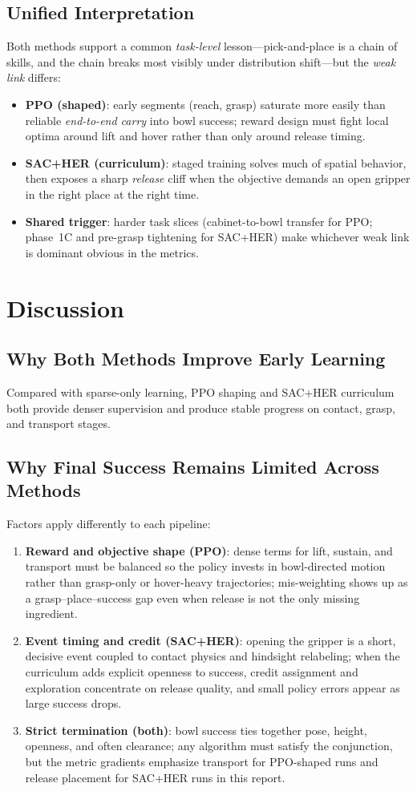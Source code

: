 \documentclass[11pt,a4paper]{article}
\begin{document}
\subsection{Unified Interpretation}
Both methods support a common \emph{task-level} lesson---pick-and-place is a chain of skills, and the chain breaks most visibly under distribution shift---but the \emph{weak link} differs:
\begin{itemize}
    \item \textbf{PPO (shaped)}: early segments (reach, grasp) saturate more easily than reliable \emph{end-to-end carry} into bowl success; reward design must fight local optima around lift and hover rather than only around release timing.
    \item \textbf{SAC+HER (curriculum)}: staged training solves much of spatial behavior, then exposes a sharp \emph{release} cliff when the objective demands an open gripper in the right place at the right time.
    \item \textbf{Shared trigger}: harder task slices (cabinet-to-bowl transfer for PPO; phase~1C and pre-grasp tightening for SAC+HER) make whichever weak link is dominant obvious in the metrics.
\end{itemize}

\section{Discussion}
\subsection{Why Both Methods Improve Early Learning}
Compared with sparse-only learning, PPO shaping and SAC+HER curriculum both provide denser supervision and produce stable progress on contact, grasp, and transport stages.

\subsection{Why Final Success Remains Limited Across Methods}
Factors apply differently to each pipeline:
\begin{enumerate}
    \item \textbf{Reward and objective shape (PPO)}: dense terms for lift, sustain, and transport must be balanced so the policy invests in bowl-directed motion rather than grasp-only or hover-heavy trajectories; mis-weighting shows up as a grasp--place--success gap even when release is not the only missing ingredient.
    \item \textbf{Event timing and credit (SAC+HER)}: opening the gripper is a short, decisive event coupled to contact physics and hindsight relabeling; when the curriculum adds explicit openness to success, credit assignment and exploration concentrate on release quality, and small policy errors appear as large success drops.
    \item \textbf{Strict termination (both)}: bowl success ties together pose, height, openness, and often clearance; any algorithm must satisfy the conjunction, but the metric gradients emphasize transport for PPO-shaped runs and release placement for SAC+HER runs in this report.
\end{enumerate}
\end{document}
